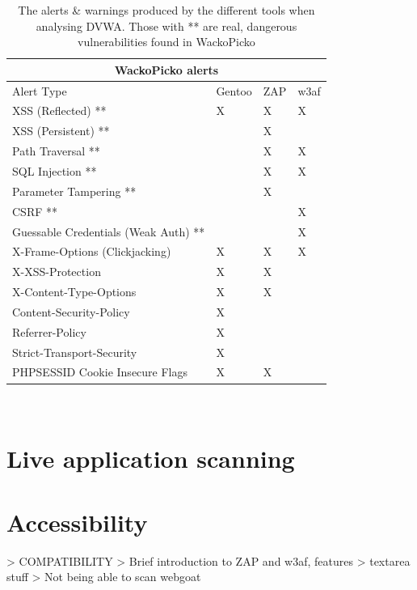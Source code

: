 \begin{table}[h]
	
	{
		
		\captionsetup{justification=centering}
		
		\caption{The alerts \& warnings produced by the different tools when analysing DVWA. Those with ** are real, dangerous vulnerabilities found in WackoPicko}
		\label{table:wackopicko_alerts}
		\begin{tabular}{ |p{7cm}|>{\centering\arraybackslash}m{2cm} |>{\centering\arraybackslash}m{2cm} |>{\centering\arraybackslash}m{2cm}| }
			\hline
			\multicolumn{4}{|c|}{\textbf{WackoPicko alerts}} \\ [0.5ex]
			\hline \hline 
			Alert Type & Gentoo & ZAP & w3af \\
			\hline
			XSS (Reflected) ** & X & X & X\\
			XSS (Persistent) ** &  & X & \\
			Path Traversal ** &  & X & X\\
			SQL Injection **& & X & X\\
			Parameter Tampering ** &  & X & \\
			CSRF ** & & & X \\
			Guessable Credentials (Weak Auth) ** & & & X \\
			X-Frame-Options (Clickjacking) & X & X & X \\
			X-XSS-Protection & X & X & \\
			X-Content-Type-Options& X & X & \\
			Content-Security-Policy & X & &\\
			Referrer-Policy & X & & \\
			Strict-Transport-Security & X  & & \\
			PHPSESSID Cookie Insecure Flags & X & X &  \\
			\hline
		\end{tabular}
	} \\
\end{table}


\section{Live application scanning}


\section{Accessibility}
> COMPATIBILITY 
	> Brief introduction to ZAP and w3af, features
	> textarea stuff	
	> Not being able to scan webgoat


